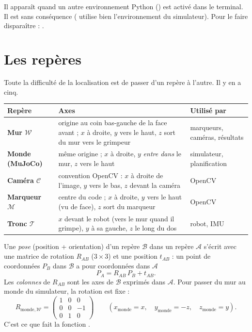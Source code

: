 \documentclass[11pt,a4paper]{article}
\newcommand{\code}[1]{\texttt{\detokenize{#1}}}
\begin{document}
\begin{attention}
Il apparaît quand un autre environnement Python (\code{tf_env}) est activé dans le terminal. Il est sans
conséquence (\code{uv} utilise bien l'environnement du simulateur). Pour le faire disparaître : \code{deactivate}.
\end{attention}

\section{Les repères}
\label{sec:reperes}

Toute la difficulté de la localisation est de passer d'un repère à l'autre. Il y en a cinq.

\begin{center}
\renewcommand{\arraystretch}{1.25}
\begin{tabularx}{\textwidth}{>{\bfseries}l X l}
\toprule
Repère & Axes & Utilisé par \\
\midrule
Mur $\mathcal{W}$ & origine au coin bas-gauche de la face avant ; $x$ à droite, $y$ vers le haut,
  $z$ sort du mur vers le grimpeur & marqueurs, caméras, résultats \\
Monde (MuJoCo) & même origine ; $x$ à droite, $y$ \emph{entre dans} le mur, $z$ vers le haut & simulateur, planification \\
Caméra $\mathcal{C}$ & convention OpenCV : $x$ à droite de l'image, $y$ vers le bas, $z$ devant la caméra & OpenCV \\
Marqueur $\mathcal{M}$ & centre du code ; $x$ à droite, $y$ vers le haut (vu de face), $z$ sort du marqueur & OpenCV \\
Tronc $\mathcal{T}$ & $x$ devant le robot (vers le mur quand il grimpe), $y$ à sa gauche, $z$ le long du dos & robot, IMU \\
\bottomrule
\end{tabularx}
\end{center}

Une \emph{pose} (position + orientation) d'un repère $\mathcal{B}$ dans un repère $\mathcal{A}$ s'écrit
avec une matrice de rotation $R_{AB}$ ($3\times3$) et une position $t_{AB}$ : un point de coordonnées
$P_B$ dans $\mathcal{B}$ a pour coordonnées dans $\mathcal{A}$
\[
  P_A = R_{AB}\,P_B + t_{AB}.
\]
Les \emph{colonnes} de $R_{AB}$ sont les axes de $\mathcal{B}$ exprimés dans $\mathcal{A}$. Pour passer du
mur au monde du simulateur, la rotation est fixe :
\[
  R_{\text{monde},\mathcal{W}} = \begin{pmatrix} 1 & 0 & 0\\ 0 & 0 & -1\\ 0 & 1 & 0\end{pmatrix}
  \qquad (x_{\text{monde}} = x,\quad y_{\text{monde}} = -z,\quad z_{\text{monde}} = y).
\]
C'est ce que fait la fonction \code{to_world()}.
\end{document}
